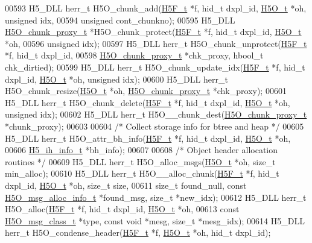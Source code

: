 \begin{DoxyCode}
00593 H5\_DLL herr\_t H5O\_chunk\_add(\hyperlink{struct_h5_f__t}{H5F\_t} *f, hid\_t dxpl\_id, \hyperlink{struct_h5_o__t}{H5O\_t} *oh, \textcolor{keywordtype}{unsigned} idx,
00594     \textcolor{keywordtype}{unsigned} cont\_chunkno);
00595 H5\_DLL \hyperlink{struct_h5_o__chunk__proxy__t}{H5O\_chunk\_proxy\_t} *H5O\_chunk\_protect(\hyperlink{struct_h5_f__t}{H5F\_t} *f, hid\_t dxpl\_id, 
      \hyperlink{struct_h5_o__t}{H5O\_t} *oh,
00596     \textcolor{keywordtype}{unsigned} idx);
00597 H5\_DLL herr\_t H5O\_chunk\_unprotect(\hyperlink{struct_h5_f__t}{H5F\_t} *f, hid\_t dxpl\_id,
00598     \hyperlink{struct_h5_o__chunk__proxy__t}{H5O\_chunk\_proxy\_t} *chk\_proxy, hbool\_t chk\_dirtied);
00599 H5\_DLL herr\_t H5O\_chunk\_update\_idx(\hyperlink{struct_h5_f__t}{H5F\_t} *f, hid\_t dxpl\_id, \hyperlink{struct_h5_o__t}{H5O\_t} *oh, \textcolor{keywordtype}{unsigned} idx);
00600 H5\_DLL herr\_t H5O\_chunk\_resize(\hyperlink{struct_h5_o__t}{H5O\_t} *oh, \hyperlink{struct_h5_o__chunk__proxy__t}{H5O\_chunk\_proxy\_t} *chk\_proxy);
00601 H5\_DLL herr\_t H5O\_chunk\_delete(\hyperlink{struct_h5_f__t}{H5F\_t} *f, hid\_t dxpl\_id, \hyperlink{struct_h5_o__t}{H5O\_t} *oh, \textcolor{keywordtype}{unsigned} idx);
00602 H5\_DLL herr\_t H5O\_\_chunk\_dest(\hyperlink{struct_h5_o__chunk__proxy__t}{H5O\_chunk\_proxy\_t} *chunk\_proxy);
00603 
00604 \textcolor{comment}{/* Collect storage info for btree and heap */}
00605 H5\_DLL herr\_t H5O\_attr\_bh\_info(\hyperlink{struct_h5_f__t}{H5F\_t} *f, hid\_t dxpl\_id, \hyperlink{struct_h5_o__t}{H5O\_t} *oh,
00606     \hyperlink{struct_h5__ih__info__t}{H5\_ih\_info\_t} *bh\_info);
00607 
00608 \textcolor{comment}{/* Object header allocation routines */}
00609 H5\_DLL herr\_t H5O\_alloc\_msgs(\hyperlink{struct_h5_o__t}{H5O\_t} *oh, \textcolor{keywordtype}{size\_t} min\_alloc);
00610 H5\_DLL herr\_t H5O\_\_alloc\_chunk(\hyperlink{struct_h5_f__t}{H5F\_t} *f, hid\_t dxpl\_id, \hyperlink{struct_h5_o__t}{H5O\_t} *oh, \textcolor{keywordtype}{size\_t} size,
00611     \textcolor{keywordtype}{size\_t} found\_null, \textcolor{keyword}{const} \hyperlink{struct_h5_o__msg__alloc__info__t}{H5O\_msg\_alloc\_info\_t} *found\_msg, \textcolor{keywordtype}{size\_t} *new\_idx);
00612 H5\_DLL herr\_t  H5O\_alloc(\hyperlink{struct_h5_f__t}{H5F\_t} *f, hid\_t dxpl\_id, \hyperlink{struct_h5_o__t}{H5O\_t} *oh,
00613     \textcolor{keyword}{const} \hyperlink{struct_h5_o__msg__class__t}{H5O\_msg\_class\_t} *type, \textcolor{keyword}{const} \textcolor{keywordtype}{void} *mesg, \textcolor{keywordtype}{size\_t} *mesg\_idx);
00614 H5\_DLL herr\_t H5O\_condense\_header(\hyperlink{struct_h5_f__t}{H5F\_t} *f, \hyperlink{struct_h5_o__t}{H5O\_t} *oh, hid\_t dxpl\_id);

\end{DoxyCode}
